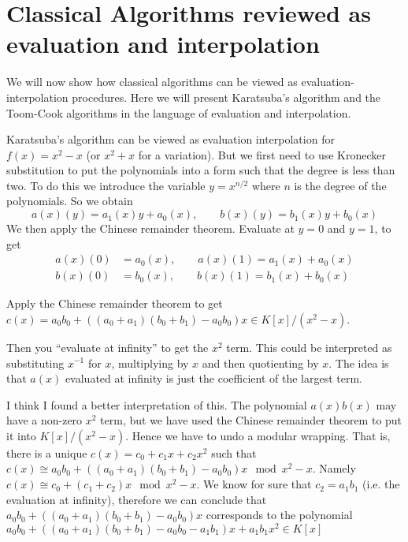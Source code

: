 \section{Classical Algorithms reviewed as evaluation and interpolation}%
\label{sec:classical_algorithms_reviewed_as_evaluation_and_interpolation}

We will now show how classical algorithms can be viewed as evaluation-interpolation procedures. Here we will present Karatsuba's algorithm and the Toom-Cook algorithms in the language of evaluation and interpolation.

Karatsuba's algorithm can be viewed as evaluation interpolation for $f(x) = x^2 - x$ (or $x^2 + x$ for a variation). But we first need to use Kronecker substitution to put the polynomials into a form such that the degree is less than two. To do this we introduce the variable $y = x^{n/2}$ where $n$ is the degree of the polynomials. So we obtain
\[
    a(x)(y) = a_1(x)y + a_0(x), \qquad b(x)(y) = b_1(x)y + b_0(x)
\]
We then apply the Chinese remainder theorem. Evaluate at $y = 0$ and $y = 1$, to get
\begin{align*}
    a(x)(0) &= a_0(x), \qquad a(x)(1) = a_1(x) + a_0(x)\\
    b(x)(0) &= b_0(x), \qquad b(x)(1) = b_1(x) + b_0(x)
\end{align*}

Apply the Chinese remainder theorem to get $c(x) = a_0b_0 + ((a_0 + a_1)(b_0 + b_1) - a_0b_0)x \in K[x]/(x^2 - x)$. 

Then you ``evaluate at infinity'' to get the $x^2$ term. This could be interpreted as substituting $x^{-1}$ for $x$, multiplying by $x$ and then quotienting by $x$. The idea is that $a(x)$ evaluated at infinity is just the coefficient of the largest term. 

I think I found a better interpretation of this. The polynomial $a(x)b(x)$ may have a non-zero $x^2$ term, but we have used the Chinese remainder theorem to put it into $K[x] / (x^2 - x)$. Hence we have to undo a modular wrapping. That is, there is a unique $c(x) = c_0 + c_1x + c_2x^2$ such that $c(x) \cong a_0b_0 + ((a_0 + a_1)(b_0 + b_1) - a_0b_0)x \mod x^2 - x$. Namely $c(x) \cong c_0 + (c_1 + c_2)x \mod x^2 - x$. We know for sure that $c_2 = a_1b_1$ (i.e. the evaluation at infinity), therefore we can conclude that $a_0b_0 + ((a_0 + a_1)(b_0 + b_1) - a_0b_0)x$ corresponds to the polynomial $a_0b_0 + ((a_0 + a_1)(b_0 + b_1) - a_0b_0 - a_1b_1)x + a_1b_1x^2 \in K[x]$

